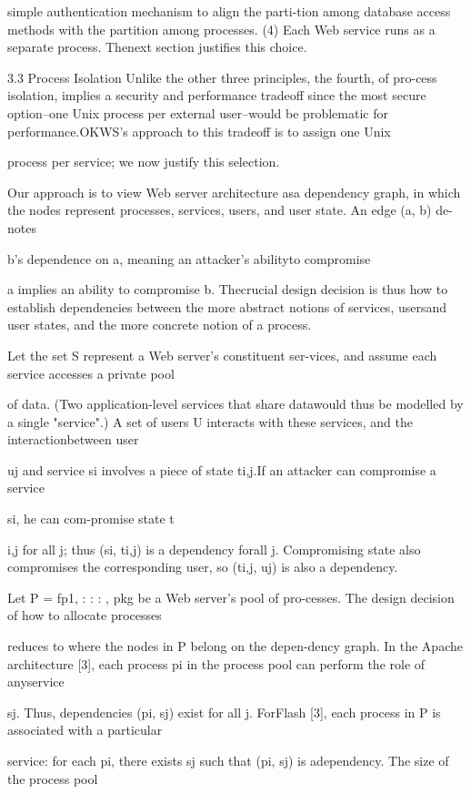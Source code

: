 simple authentication mechanism to align the parti-tion among database access methods with the partition among processes.
(4) Each Web service runs as a separate process. Thenext section justifies this choice.

3.3 Process Isolation
Unlike the other three principles, the fourth, of pro-cess isolation, implies a security and performance tradeoff since the most secure option--one Unix process per
external user--would be problematic for performance.OKWS's approach to this tradeoff is to assign one Unix

process per service; we now justify this selection.

Our approach is to view Web server architecture asa dependency graph, in which the nodes represent processes, services, users, and user state. An edge (a, b) de-notes

b's dependence on a, meaning an attacker's abilityto compromise

a implies an ability to compromise b. Thecrucial design decision is thus how to establish dependencies between the more abstract notions of services, usersand user states, and the more concrete notion of a process.

Let the set S represent a Web server's constituent ser-vices, and assume each service accesses a private pool

of data. (Two application-level services that share datawould thus be modelled by a single "service".) A set of
users U interacts with these services, and the interactionbetween user

uj and service si involves a piece of state ti,j.If an attacker can compromise a service

si, he can com-promise state t

i,j for all j; thus (si, ti,j) is a dependency forall j. Compromising state also compromises the corresponding user, so (ti,j, uj) is also a dependency.

Let P = fp1, : : : , pkg be a Web server's pool of pro-cesses. The design decision of how to allocate processes

reduces to where the nodes in P belong on the depen-dency graph. In the Apache architecture [3], each process pi in the process pool can perform the role of anyservice

sj. Thus, dependencies (pi, sj) exist for all j. ForFlash [3], each process in P is associated with a particular

service: for each pi, there exists sj such that (pi, sj) is adependency. The size of the process pool

